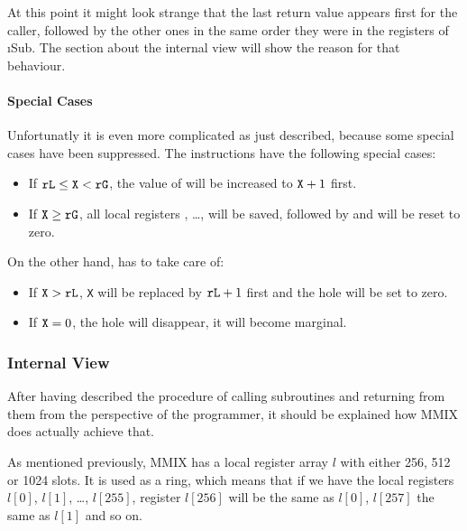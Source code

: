 At this point it might look strange that the last return value appears first for the caller, followed by the other ones in the same order they were in the registers of \i{Sub}. The section about the internal view will show the reason for that behaviour.

\paragraph{Special Cases}

Unfortunatly it is even more complicated as just described, because some special cases have been suppressed. The instructions  have the following special cases:
\begin{itemize}
	\item If ${\tt rL} \le {\tt X} < {\tt rG}$, the value of  will be increased to ${\tt X} + 1$ first.
	\item If ${\tt X} \ge {\tt rG}$, all local registers , \dots,  will be saved, followed by  and  will be reset to zero.
\end{itemize}
On the other hand,  has to take care of:
\begin{itemize}
	\item If ${\tt X} > {\tt rL}$, {\tt X} will be replaced by ${\tt rL} + 1$ first and the hole will be set to zero.
	\item If ${\tt X} = 0$, the hole will disappear, \ie it will become marginal.
\end{itemize}
\citep[pg. 22,23]{mmix-doc}

\subsubsection{Internal View}

After having described the procedure of calling subroutines and returning from them from the perspective of the programmer, it should be explained how MMIX does actually achieve that.

As mentioned previously, MMIX has a local register array $l$ with either 256, 512 or 1024 slots. It is used as a ring, which means that if we have the local registers $l[0]$, $l[1]$, \dots, $l[255]$, register $l[256]$ will be the same as $l[0]$, $l[257]$ the same as $l[1]$ and so on.

